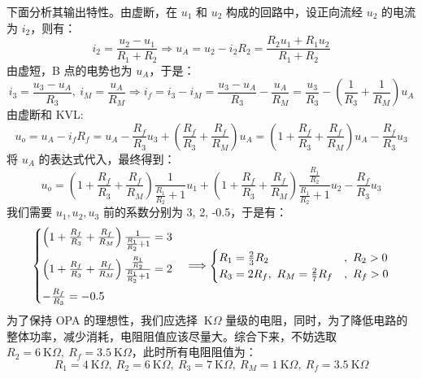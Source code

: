 \documentclass[UTF8]{report}
\def\KO{\ \mathrm{K}\Omega}
\theoremstyle{MyLineTheoremStyle} %
\theoremstyle{MyBlockTheoremStyle} %
\theoremstyle{MySubsubsectionStyle} %
\begin{document}
下面分析其输出特性。由虚断，在 $u_1$ 和 $u_2$ 构成的回路中，设正向流经 $u_2$ 的电流为 $i_2$，则有：
\begin{equation}
i_2 = \frac{u_2 - u_1}{R_1+R_2}
\Longrightarrow  
u_A = u_2 - i_2R_2 = \frac{R_2u_1 + R_1u_2}{R_1 + R_2}
\end{equation}
由虚短，B 点的电势也为 $u_A$，于是：
\begin{equation}
i_3 = \frac{u_3 - u_A}{R_3},\ i_M = \frac{u_A}{R_M} \Longrightarrow  i_f = i_3 - i_M = \frac{u_3 - u_A}{R_3} - \frac{u_A}{R_M} = \frac{u_3}{R_3} - (\frac{1}{R_3} + \frac{1}{R_M})u_A
\end{equation}
由虚断和 KVL:
\begin{equation}
u_o = u_A - i_fR_f = u_A - \frac{R_f}{R_3}u_3 + (\frac{R_f}{R_3} + \frac{R_f}{R_M})u_A = \left( 1 +  \frac{R_f}{R_3} + \frac{R_f}{R_M}\right)u_A - \frac{R_f}{R_3}u_3
\end{equation}
将 $u_A$ 的表达式代入，最终得到：
\begin{equation}
\boxed{
    u_o = \left( 1 +  \frac{R_f}{R_3} + \frac{R_f}{R_M}\right)\frac{1}{\frac{R_1}{R_2} + 1}u_1 
    + \left( 1 +  \frac{R_f}{R_3} + \frac{R_f}{R_M}\right)\frac{\frac{R_1}{R_2}}{\frac{R_1}{R_2} + 1}u_2
    - \frac{R_f}{R_3}u_3
}
\end{equation}
我们需要 $u_1,u_2,u_3$ 前的系数分别为 3, 2, -0.5，于是有：
\begin{equation}
\begin{cases}
    \left( 1 +  \frac{R_f}{R_3} + \frac{R_f}{R_M}\right)\frac{1}{\frac{R_1}{R_2} + 1} = 3 \vspace*{5pt}\\ 
    \vspace*{5pt}
    \left( 1 +  \frac{R_f}{R_3} + \frac{R_f}{R_M}\right)\frac{\frac{R_1}{R_2}}{\frac{R_1}{R_2} + 1} = 2 \\ 
    -\frac{R_f}{R_3} = -0.5
\end{cases}
\Longrightarrow 
\begin{cases}
    R_1 = \frac{2}{3}R_2 &,\ R_2 > 0\\ 
    R_3 = 2R_f,\ R_M = \frac{2}{7}R_f &,\ R_f >0\\
\end{cases}
\end{equation}
为了保持 OPA 的理想性，我们应选择 $\KO$ 量级的电阻，同时，为了降低电路的整体功率，减少消耗，电阻阻值应该尽量大。综合下来，不妨选取 $R_2 = 6 \KO,\ R_f = 3.5 \KO$，此时所有电阻阻值为：
\begin{equation}
R_1 = 4\KO,\ R_2 = 6\KO,\ R_3 = 7\KO,\ R_M = 1\KO,\ R_f = 3.5\KO
\end{equation}
\end{document}
